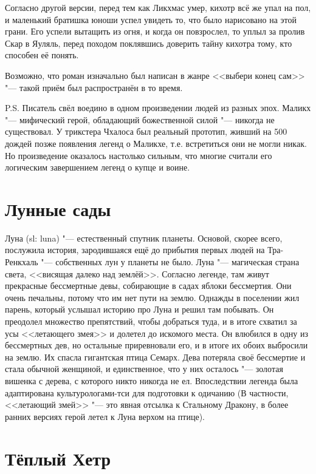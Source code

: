 \documentclass[a4paper,10pt]{book}
\begin{document}
Согласно другой версии, перед тем как Ликхмас умер, кихотр всё же упал на пол, 
и маленький братишка юноши успел увидеть то, что было нарисовано на этой грани. 
Его успели вытащить из огня, и когда он повзрослел, то уплыл за пролив Скар в 
Яуляль, перед походом поклявшись доверить тайну кихотра тому, кто способен её 
понять.

Возможно, что роман изначально был написан в жанре <<выбери конец сам>> "--- 
такой приём был распространён в то время.

P.S. Писатель свёл воедино в одном произведении людей из разных эпох. Маликх 
"--- мифический герой, обладающий божественной силой "--- никогда не 
существовал. 
У трикстера Чхалоса был реальный прототип, живший на 500 дождей позже появления 
легенд о Маликхе, т.е. встретиться они не могли никак. Но произведение 
оказалось настолько сильным, что многие считали его логическим завершением 
легенд о купце и воине.

\section{Лунные сады}

Луна (sl: luna) "--- естественный спутник планеты. Основой, скорее 
всего, послужила история, зародившаяся ещё до прибытия первых людей на 
Тра-Ренкхаль "--- собственных лун у планеты не было. Луна "--- магическая 
страна 
света, <<висящая далеко над землёй>>. Согласно легенде, там живут прекрасные 
бессмертные девы, собирающие в садах яблоки бессмертия. Они очень печальны, 
потому что им нет пути на землю. Однажды в поселении жил парень, который 
услышал 
историю про Луна и решил там побывать. Он преодолел множество препятствий, 
чтобы 
добраться туда, и в итоге схватил за усы <<летающего змея>> и долетел до 
искомого места. Он влюбился в одну из бессмертных дев, но остальные 
приревновали 
его, и в итоге их обоих выбросили на землю. Их спасла гигантская птица Семарх. 
Дева потеряла своё бессмертие и стала обычной женщиной, и единственное, что у 
них осталось "--- золотая вишенка с дерева, с которого никто никогда не ел. 
Впоследствии легенда была адаптирована культурологами-тси для подготовки к 
одичанию
(В частности, <<летающий змей>> "--- это явная отсылка к Стальному Дракону, в 
более ранних версиях
герой летел к Луна верхом на птице).

\section{Тёплый Хетр}
\end{document}
